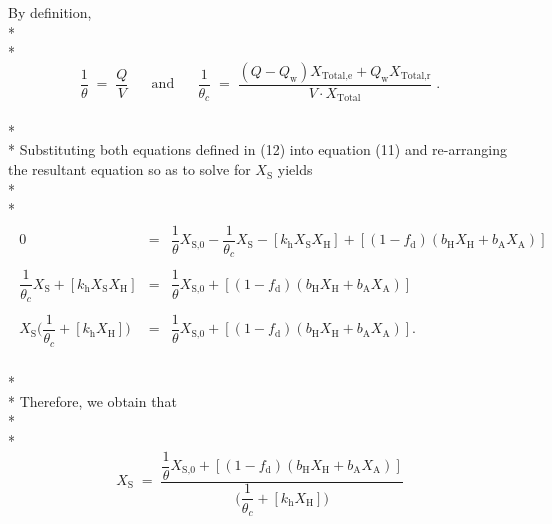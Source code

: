 \documentclass[]{article}
\begin{document}
By definition, \\* \\* 
\begin{equation}
\dfrac{1}{\theta} \; = \; \dfrac{Q}{V} \; \; \; \; \; \;  \text{and} \; \; \; \; \; \; \dfrac{1}{\theta_c} \; = \; \dfrac{(Q-Q_{\text{w}})X_{\text{Total,e}} + Q_{\text{w}}X_{\text{Total,r}}}{V \cdot X_{\text{Total}}} \; .
\end{equation} \\* \\* 
Substituting both equations defined in (12) into equation (11) and re-arranging the resultant equation so as to solve for $X_{\text{S}}$ yields \\* \\* 
\begin{align}
\nonumber
\begin{array}{rcl}
0 &=& \dfrac{1}{\theta}X_{\text{S,0}} - \dfrac{1}{\theta_c}X_{\text{S}} - [k_{\text{h}}X_{\text{S}}X_{\text{H}}] + [(1-f_{\text{d}})(b_{\text{H}}X_{\text{H}} + b_{\text{A}}X_{\text{A}})] \\ \\
\dfrac{1}{\theta_c}X_{\text{S}} + [k_{\text{h}}X_{\text{S}}X_{\text{H}}] &=& \dfrac{1}{\theta}X_{\text{S,0}} + [(1-f_{\text{d}})(b_{\text{H}}X_{\text{H}} + b_{\text{A}}X_{\text{A}})] \\ \\
X_{\text{S}} \Bigg(\dfrac{1}{\theta_c} + [k_{\text{h}}X_{\text{H}}]\Bigg) &=& \dfrac{1}{\theta}X_{\text{S,0}} + [(1-f_{\text{d}})(b_{\text{H}}X_{\text{H}} + b_{\text{A}}X_{\text{A}})].
\end{array}
\end{align} \\* \\* 
Therefore, we obtain that \\* \\* 
\begin{equation}
\nonumber
\boxed{X_{\text{S}} \; = \; \dfrac{\dfrac{1}{\theta}X_{\text{S,0}} + [(1-f_{\text{d}})(b_{\text{H}}X_{\text{H}} + b_{\text{A}}X_{\text{A}})]}{\Bigg(\dfrac{1}{\theta_c} + [k_{\text{h}}X_{\text{H}}]\Bigg)}}
\end{equation}
\newpage
\end{document}
